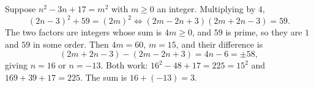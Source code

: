 Suppose $n^2-3n+17=m^2$ with $m\ge0$ an integer. Multiplying by $4$,
\[(2n-3)^2+59=(2m)^2\iff(2m-2n+3)(2m+2n-3)=59.\]
The two factors are integers whose sum is $4m\ge0$, and $59$ is prime, so they are $1$ and $59$ in some order. Then $4m=60$, $m=15$, and their difference is
\[(2m+2n-3)-(2m-2n+3)=4n-6=\pm58,\]
giving $n=16$ or $n=-13$. Both work: $16^2-48+17=225=15^2$ and $169+39+17=225$. The sum is $16+(-13)=\boxed{3}$.
